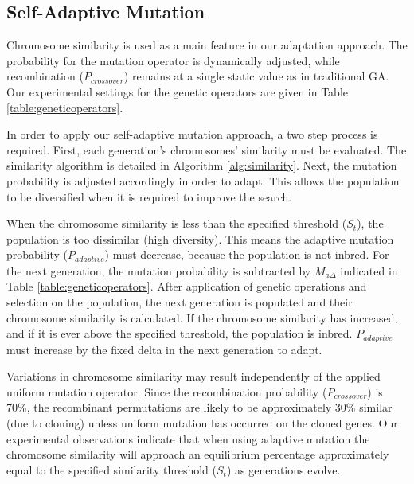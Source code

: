 \documentclass[conference]{IEEEtran}
\begin{document}
\subsection{Self-Adaptive Mutation}
Chromosome similarity is used as a main feature in our adaptation approach. The probability for the mutation operator is dynamically adjusted, while recombination ($P_{crossover}$) remains at a single static value as in traditional GA. Our experimental settings for the genetic operators are given in Table \ref{table:geneticoperators}.

In order to apply our self-adaptive mutation approach, a two step process is required. First, each generation's chromosomes' similarity must be evaluated. The similarity algorithm is detailed in Algorithm \ref{alg:similarity}. Next, the mutation probability is adjusted accordingly in order to adapt. This allows the population to be diversified when it is required to improve the search.

When the chromosome similarity is less than the specified threshold ($S_{t}$), the population is too dissimilar (high diversity). This means the adaptive mutation probability ($P_{adaptive}$) must decrease, because the population is not inbred. For the next generation, the mutation probability is subtracted by $M_{a\Delta}$ indicated in Table \ref{table:geneticoperators}. After application of genetic operations and selection on the population, the next generation is populated and their chromosome similarity is calculated. If the chromosome similarity has increased, and if it is ever above the specified threshold, the population is inbred. $P_{adaptive}$ must increase by the fixed delta in the next generation to adapt.

Variations in chromosome similarity may result independently of the applied uniform mutation operator. Since the recombination probability ($P_{crossover}$) is 70\%, the recombinant permutations are likely to be approximately 30\% similar (due to cloning) unless uniform mutation has occurred on the cloned genes. Our experimental observations indicate that when using adaptive mutation the chromosome similarity will approach an equilibrium percentage approximately equal to the specified similarity threshold ($S_{t}$) as generations evolve.
\end{document}
